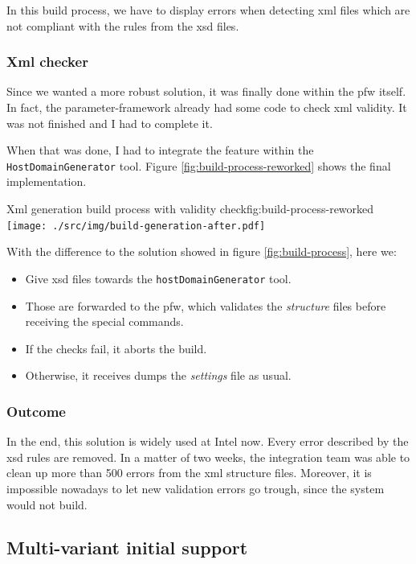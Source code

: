 In this build process, we have to display errors when detecting \gls{xml} files which are not compliant with the rules from the
\gls{xsd} files.

\subsubsection{Xml checker}

Since we wanted a more robust solution, it was finally done within the \gls{pfw} itself.
In fact, the parameter-framework already had some code to check \gls{xml} validity. It was not
finished and I had to complete it.

When that was done, I had to integrate the feature within the \lstinline{HostDomainGenerator} tool.
Figure \ref{fig:build-process-reworked} shows the final implementation.

\begin{figureGraphics}{Xml generation build process with validity check}{fig:build-process-reworked}
    \texttt{[image: ./src/img/build-generation-after.pdf]}
\end{figureGraphics}

With the difference to the solution showed in figure \ref{fig:build-process}, here we:
\begin{itemize}
    \item Give \gls{xsd} files towards the \lstinline{hostDomainGenerator} tool.
    \item Those are forwarded to the \gls{pfw}, which validates the \emph{structure} files before receiving the special commands.
    \item If the checks fail, it aborts the build.
    \item Otherwise, it receives dumps the \emph{settings} file as usual.
\end{itemize}

\subsubsection{Outcome}
In the end, this solution is widely used at Intel now. Every error described by the \gls{xsd} rules are removed.
In a matter of two weeks, the integration team was able to clean up more than 500 errors from the \gls{xml} structure files.
Moreover, it is impossible nowadays to let new validation errors go trough, since the system would not build.


\subsection{Multi-variant initial support}
